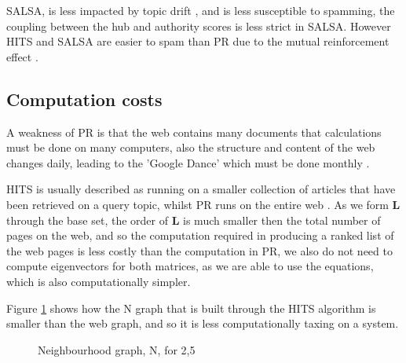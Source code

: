 \documentclass[11pt]{report}
\begin{document}
{SALSA, is less impacted by topic drift \cite{lempel2000stochastic}, and is less susceptible to spamming, the coupling between the hub and authority scores is less strict in SALSA. However HITS and SALSA are easier to spam than PR due to the mutual reinforcement effect \cite{langville}. 

\subsection{Computation costs}
A weakness of PR is that the web contains many documents that calculations must be done on many computers, also the structure and content of the web changes daily, leading to the 'Google Dance' which must be done monthly \cite{thorson2004modeling}. 

HITS is usually described as running on a smaller collection of articles that have been retrieved on a query topic, whilst PR runs on the entire web \cite{ng2001link}. As we form \textbf{L} through the base set, the order of \textbf{L} is much smaller then the total number of pages on the web, and so the computation required in producing a ranked list of the web pages is less costly than the computation in PR, we also do not need to compute eigenvectors for both matrices, as we are able to use the equations, which is also computationally simpler. 

Figure \ref{fig:N build} shows how the N graph that is built through the HITS algorithm is smaller than the web graph, and so it is less computationally taxing on a system.

\begin{figure}[h] 
\centering
{} \qquad\qquad
{}
\caption{Neighbourhood graph, N,  for {2,5}} \label{fig:N build}
\end{figure}


}
\end{document}
